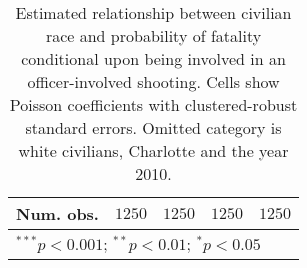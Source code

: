 \begin{table}[ht!]
\begin{center}
\begin{tabular}{l c c c c}
\midrule
Num. obs.                  & $1250$       & $1250$        & $1250$       & $1250$         \\
\bottomrule
\multicolumn{5}{l}{\scriptsize{$^{***}p<0.001$; $^{**}p<0.01$; $^{*}p<0.05$}}
\end{tabular}
\caption{Estimated relationship between civilian race and probability of fatality conditional upon being involved in an officer-involved shooting. Cells show Poisson coefficients with clustered-robust standard errors. Omitted category is white civilians, Charlotte and the year 2010.}
\label{tab:poisson_FE}
\end{center}
\end{table}
